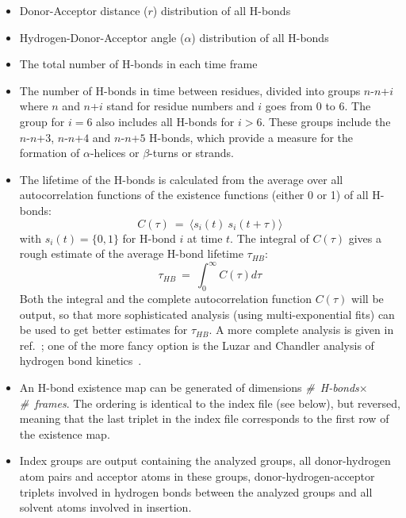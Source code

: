 \begin{itemize}
\item
Donor-Acceptor distance ($r$) distribution of all H-bonds
\item
Hydrogen-Donor-Acceptor angle ($\alpha$) distribution of all H-bonds 
\item
The total number of H-bonds in each time frame
\item
\newcommand{\nn}[1]{$n$-$n$+$#1$}
The number of H-bonds in time between residues, divided into groups
\nn{i} where $n$ and $n$+$i$ stand for residue numbers and $i$ goes
from 0 to 6. The group for $i=6$ also includes all H-bonds for
$i>6$. These groups include the \nn{3}, \nn{4} and \nn{5} H-bonds,
which provide a measure for the formation of $\alpha$-helices or
$\beta$-turns or strands.
\item
The lifetime of the H-bonds is calculated from the average over all
autocorrelation functions of the existence functions (either 0 or 1)
of all H-bonds:
\begin{equation}
C(\tau) ~=~ \langle s_i(t)~s_i (t + \tau) \rangle
\label{eqn:hbcorr}
\end{equation}
with $s_i(t) = \{0,1\}$ for H-bond $i$ at time $t$. The integral of
$C(\tau)$ gives a rough estimate of the average H-bond lifetime
$\tau_{HB}$:
\begin{equation}
\tau_{HB} ~=~ \int_{0}^{\infty} C(\tau) d\tau
\label{eqn:hblife}
\end{equation}
Both the integral and the complete autocorrelation function $C(\tau)$
will be output, so that more sophisticated analysis ({\eg}\@ using
multi-exponential fits) can be used to get better estimates for
$\tau_{HB}$. A more complete analysis is given in ref.~\cite{Spoel2006b};
one of the more fancy option is the Luzar and Chandler analysis
of hydrogen bond kinetics~\cite{Luzar96b,Luzar2000a}. 
\item
An H-bond existence map can be generated of dimensions {\em
\#~H-bonds}$\times${\em \#~frames}. The ordering is identical to the index 
file (see below), but reversed, meaning that the last triplet in the index
file corresponds to the first row of the existence map.
\item
Index groups are output containing the analyzed groups, all
donor-hydrogen atom pairs and acceptor atoms in these groups,
donor-hydrogen-acceptor triplets involved in hydrogen bonds between
the analyzed groups and all solvent atoms involved in insertion.

\end{itemize}



